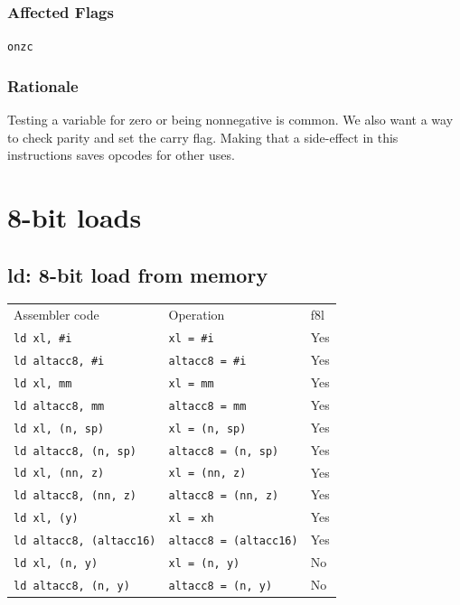 \documentclass{book}
\begin{document}
\subsubsection*{Affected Flags}

\texttt{onzc}

\subsubsection*{Rationale}

Testing a variable for zero or being nonnegative is common. We also want a way to check parity and set the carry flag. Making that a side-effect in this instructions saves opcodes for other uses.


\section{8-bit loads}

\subsection{ld: 8-bit load from memory}

\begin{tabular}{l l l}
Assembler code                  & Operation                     & f8l \\
\texttt{ld xl, \#i}             & \texttt{xl = \#i}             & Yes \\
\texttt{ld altacc8, \#i}        & \texttt{altacc8 = \#i}        & Yes \\
\texttt{ld xl, mm}              & \texttt{xl = mm}              & Yes \\
\texttt{ld altacc8, mm}         & \texttt{altacc8 = mm}         & Yes \\
\texttt{ld xl, (n, sp)}         & \texttt{xl = (n, sp)}         & Yes \\
\texttt{ld altacc8, (n, sp)}    & \texttt{altacc8 = (n, sp)}    & Yes \\
\texttt{ld xl, (nn, z)}         & \texttt{xl = (nn, z)}         & Yes \\
\texttt{ld altacc8, (nn, z)}    & \texttt{altacc8 = (nn, z)}    & Yes \\
\texttt{ld xl, (y)}             & \texttt{xl = xh}              & Yes \\
\texttt{ld altacc8, (altacc16)} & \texttt{altacc8 = (altacc16)} & Yes \\
\texttt{ld xl, (n, y)}          & \texttt{xl = (n, y)}          & No \\
\texttt{ld altacc8, (n, y)}     & \texttt{altacc8 = (n, y)}     & No \\
\end{tabular}
\end{document}
